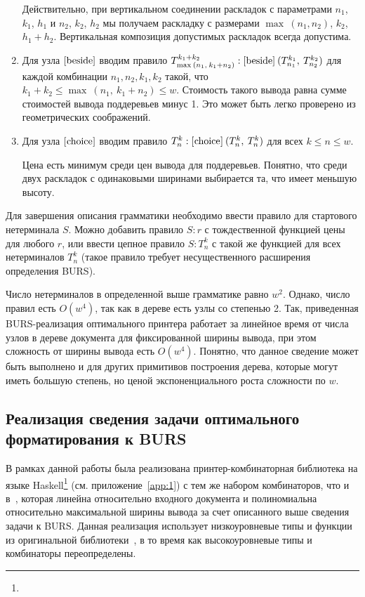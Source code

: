 \begin{enumerate}
Действительно, при вертикальном соединении раскладок с параметрами
$n_1$, $k_1$, $h_1$ и $n_2$, $k_2$, $h_2$ мы получаем раскладку с размерами
$\max\:(n_1,n_2)$, $k_2$, $h_1+h_2$. Вертикальная композиция допустимых раскладок всегда допустима.

\item Для узла $[\mbox{\lstinline{beside}}]$ вводим правило
  $T^{k_1+k_2}_{\max\:(n_1,\:k_1+n_2)}:[\mbox{\lstinline{beside}}]\:(T^{k_1}_{n_1},\:T^{k_2}_{n_2})$
  для каждой комбинации $n_1, n_2, k_1, k_2$ такой, что $k_1+k_2\le\max\:(n_1,\:k_1+n_2)\le w$.
  Стоимость такого вывода равна сумме стоимостей вывода поддеревьев минус 1.
  Это может быть легко проверено из геометрических соображений.

\item Для узла $[\mbox{\lstinline{choice}}]$ вводим правило
  $T^k_n:[\mbox{\lstinline{choice}}]\:(T^k_n,\:T^k_n)$ для всех $k\le n\le w$.

  Цена есть минимум среди цен вывода для поддеревьев. Понятно, что среди двух раскладок
  с одинаковыми ширинами выбирается та, что имеет меньшую высоту.
\end{enumerate}

Для завершения описания грамматики необходимо ввести правило для стартового нетерминала $S$.
Можно добавить правило $S : r$ с тождественной функцией цены для любого $r$, или ввести
цепное правило $S: T_n^k$ с такой же функцией для всех нетерминалов $T_n^k$
(такое правило требует несущественного расширения определения BURS).

Число нетерминалов в определенной выше грамматике равно $w^2$.
Однако, число правил есть $O(w^4)$, так
как в дереве есть узлы со степенью 2. Так, приведенная BURS-реализация оптимального принтера
работает за линейное время от числа узлов в дереве документа для фиксированной ширины вывода, при
этом сложность от ширины вывода есть $O(w^4)$. Понятно, что данное сведение может быть выполнено и
для других примитивов построения дерева, которые могут иметь большую степень, но ценой
экспоненциального роста сложности по $w$.
\label{txt:bursReduction}

\subsection{Реализация сведения задачи оптимального форматирования к BURS}

В рамках данной работы была реализована
принтер-комбинаторная библиотека на языке
Haskell\footnote{}
(см. приложение~\ref{app:1})
с тем же набором комбинаторов,
что и в~\cite{swierstra},
которая линейна относительно входного документа и полиномиальна
относительно максимальной ширины вывода за счет описанного выше сведения задачи к BURS.
Данная реализация использует низкоуровневые типы и функции из оригинальной
библиотеки~\cite{swierstra}, в то время как высокоуровневые типы и комбинаторы переопределены.

